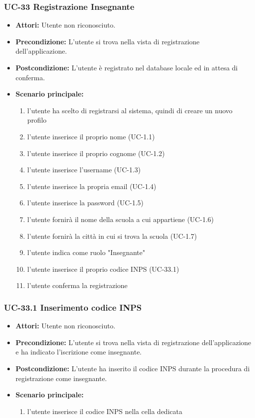 \subsubsection{UC-33 Registrazione Insegnante}
\begin{itemize}
	\item \textbf{Attori: }Utente non riconosciuto.
	\item \textbf{Precondizione: }L'utente si trova nella vista di registrazione dell'applicazione.
	\item \textbf{Postcondizione: }L'utente è registrato nel database locale ed in attesa di conferma.
	\item \textbf{Scenario principale: }
		\begin{enumerate}
		\item l'utente ha scelto di registrarsi al sistema, quindi di creare un nuovo profilo
		\item l'utente inserisce il proprio nome (UC-1.1)
		\item l'utente inserisce il proprio cognome (UC-1.2)
		\item l'utente inserisce l'username (UC-1.3)
		\item l'utente inserisce la propria email (UC-1.4)
		\item l'utente inserisce la password (UC-1.5)
		\item l'utente fornirà il nome della scuola a cui appartiene (UC-1.6)
		\item l'utente fornirà la città in cui si trova la scuola (UC-1.7)
		\item l'utente indica come ruolo "Insegnante"
		\item l'utente inserisce il proprio codice INPS (UC-33.1)
		\item l'utente conferma la registrazione
		\end{enumerate}
\end{itemize}

\subsubsection{UC-33.1 Inserimento codice INPS}
\begin{itemize}
	\item \textbf{Attori: }Utente non riconosciuto.
	\item \textbf{Precondizione: }L'utente si trova nella vista di registrazione dell'applicazione e ha indicato l'iscrizione come insegnante.
	\item \textbf{Postcondizione: }
		L'utente ha inserito il codice INPS durante la procedura di registrazione come insegnante.
		\item \textbf{Scenario principale:}
		\begin{enumerate}
			\item l'utente inserisce il codice INPS nella cella dedicata
		\end{enumerate}
\end{itemize}

